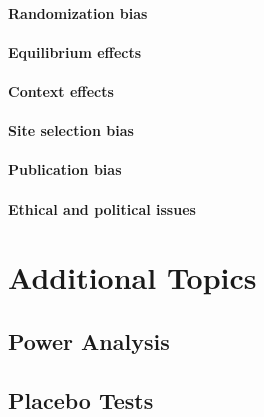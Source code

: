 \documentclass[
]{book}
\theoremstyle{definition}
\theoremstyle{definition}
\theoremstyle{definition}
\theoremstyle{definition}
\theoremstyle{remark}
\begin{document}
\hypertarget{randomization-bias}{%
\subsection{Randomization bias}\label{randomization-bias}}

\hypertarget{equilibrium-effects}{%
\subsection{Equilibrium effects}\label{equilibrium-effects}}

\hypertarget{context-effects}{%
\subsection{Context effects}\label{context-effects}}

\hypertarget{site-selection-bias}{%
\subsection{Site selection bias}\label{site-selection-bias}}

\hypertarget{publication-bias}{%
\subsection{Publication bias}\label{publication-bias}}

\hypertarget{ethical-and-political-issues}{%
\subsection{Ethical and political issues}\label{ethical-and-political-issues}}

\hypertarget{part-additional-topics}{%
\part{Additional Topics}\label{part-additional-topics}}

\hypertarget{Power}{%
\chapter{Power Analysis}\label{Power}}

\hypertarget{Placebo}{%
\chapter{Placebo Tests}\label{Placebo}}
\end{document}
